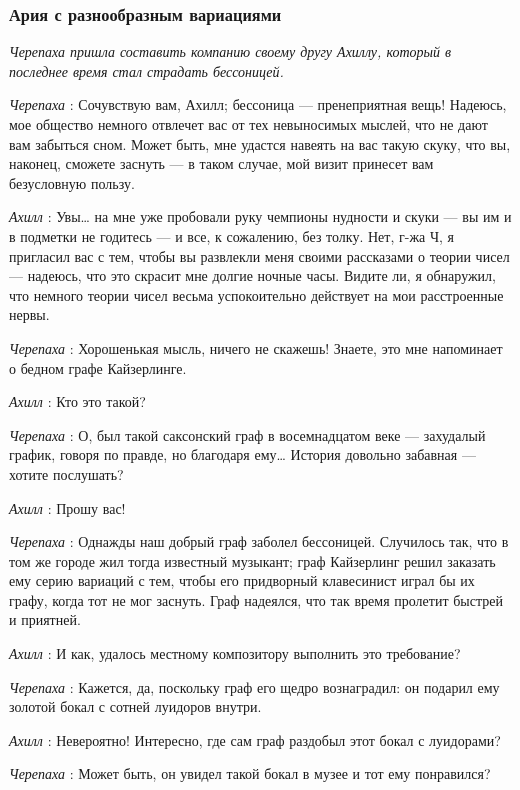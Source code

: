 \subsubsection{Ария с разнообразным вариациями}

\emph{Черепаха пришла составить компанию своему другу Ахиллу, который в последнее время стал страдать бессоницей.}

\emph{Черепаха} : Сочувствую вам, Ахилл; бессоница --- пренеприятная вещь! Надеюсь, мое общество немного отвлечет вас от тех невыносимых мыслей, что не дают вам забыться сном. Может быть, мне удастся навеять на вас такую скуку, что вы, наконец, сможете заснуть --- в таком случае, мой визит принесет вам безусловную пользу.

\emph{Ахилл} : Увы\ldots{} на мне уже пробовали руку чемпионы нудности и скуки --- вы им и в подметки не годитесь --- и все, к сожалению, без толку. Нет, г-жа Ч, я пригласил вас с тем, чтобы вы развлекли меня своими рассказами о теории чисел --- надеюсь, что это скрасит мне долгие ночные часы. Видите ли, я обнаружил, что немного теории чисел весьма успокоительно действует на мои расстроенные нервы.

\emph{Черепаха} : Хорошенькая мысль, ничего не скажешь! Знаете, это мне напоминает о бедном графе Кайзерлинге.

\emph{Ахилл} : Кто это такой?

\emph{Черепаха} : О, был такой саксонский граф в восемнадцатом веке --- захудалый график, говоря по правде, но благодаря ему\ldots{} История довольно забавная --- хотите послушать?

\emph{Ахилл} : Прошу вас!

\emph{Черепаха} : Однажды наш добрый граф заболел бессоницей. Случилось так, что в том же городе жил тогда известный музыкант; граф Кайзерлинг решил заказать ему серию вариаций с тем, чтобы его придворный клавесинист играл бы их графу, когда тот не мог заснуть. Граф надеялся, что так время пролетит быстрей и приятней.

\emph{Ахилл} : И как, удалось местному композитору выполнить это требование?

\emph{Черепаха} : Кажется, да, поскольку граф его щедро вознаградил: он подарил ему золотой бокал с сотней луидоров внутри.

\emph{Ахилл} : Невероятно! Интересно, где сам граф раздобыл этот бокал с луидорами?

\emph{Черепаха} : Может быть, он увидел такой бокал в музее и тот ему понравился?

